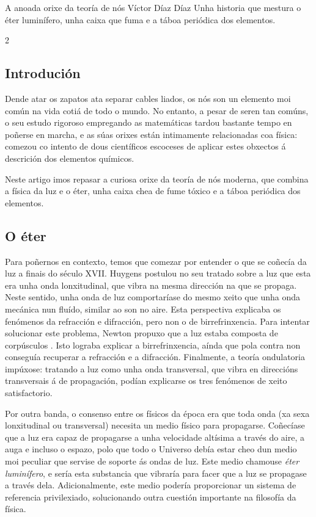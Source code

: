 \Artigo*%
{historia}%
{A anoada orixe da teoría de nós}
{Víctor Díaz Díaz}
{Unha historia que mestura o éter luminífero, unha caixa que fuma e a táboa
periódica dos elementos.}

\begin{multicols}{2}

\subsection*{Introdución}

Dende atar os zapatos ata separar cables liados, os nós son un elemento moi %
común na vida cotiá de todo o mundo. No entanto, a pesar de seren tan comúns, o
seu estudo rigoroso empregando as matemáticas tardou bastante tempo en poñerse
en marcha, e as súas orixes están intimamente relacionadas coa física: comezou
co intento de dous científicos escoceses de aplicar estes obxectos á descrición
dos elementos químicos.

Neste artigo imos repasar a curiosa orixe da teoría de nós moderna, que combina
a física da luz e o éter, unha caixa chea de fume tóxico e a táboa periódica
dos elementos.

\subsection*{O éter}

Para poñernos en contexto, temos que comezar por entender o que se coñecía da
luz a finais do século XVII. Huygens postulou no seu tratado sobre a luz
\cite{Huygens} que esta era unha onda lonxitudinal, que vibra na mesma
dirección na que se propaga. Neste sentido, unha onda de luz comportaríase do
mesmo xeito que unha onda mecánica nun fluído, similar ao son no aire. Esta
perspectiva explicaba os fenómenos da refracción e difracción, pero non o de
birrefrinxencia. Para intentar solucionar este problema, Newton propuxo que a luz
estaba composta de corpúsculos \cite{Newton}. Isto lograba explicar a
birrefrinxencia, aínda que pola contra non conseguía recuperar a refracción e a
difracción. Finalmente, a teoría ondulatoria impúxose: tratando a luz como unha
onda transversal, que vibra en direccións transversais á de propagación, podían
explicarse os tres fenómenos de xeito satisfactorio.

Por outra banda, o consenso entre os físicos da época era que toda onda (xa
sexa lonxitudinal ou transversal) necesita un medio físico para propagarse.
Coñecíase que a luz era capaz de propagarse a unha velocidade altísima a través
do aire, a auga e incluso o espazo, polo que todo o Universo debía estar cheo
dun medio moi peculiar que servise de soporte ás ondas de luz. Este medio
chamouse \textit{éter luminífero}, e sería esta substancia que vibraría para
facer que a luz se propagase a través dela. Adicionalmente, este medio podería
proporcionar un sistema de referencia privilexiado, solucionando outra cuestión
importante na filosofía da física.


\end{multicols}
